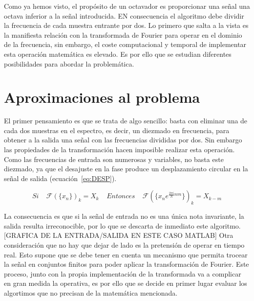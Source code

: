 Como ya hemos visto, el propósito de un octavador es proporcionar una señal una octava inferior a la señal introducida. EN consecuencia el algoritmo debe dividir la frecuencia de cada muestra entrante por dos. Lo primero que salta a la vista es la manifiesta relación con la transformada de Fourier para operar en el dominio de la frecuencia, sin embargo, el coste computacional y temporal de implementar esta operación matemática es elevado. Es por ello que se estudian diferentes posibilidades para abordar la problemática.

\section{Aproximaciones al problema}
El primer pensamiento es que se trata de algo sencillo: basta con eliminar una de cada dos muestras en el espectro, es decir, un diezmado en frecuencia, para obtener a la salida una señal con las frecuencias divididas por dos. Sin embargo las propiedades de la transformación hacen imposible realizar esta operación. Como las frecuencias de entrada son numerosas y variables, no basta este diezmado, ya que el desajuste en la fase produce un desplazamiento circular en la señal de salida (ecuación~\ref{eq:DESP}). 

\begin{equation}
\label{eq:DESP}
Si~~~~~\mathscr{F}(\{x_{n}\})_{k} = X_{k}~~~~~Entonces~~~~~\mathscr{F}(\{x_{n}e^{\frac{2\pi i}{N}nm}\})_{k}= X_{k-m} 
\end{equation}

La consecuencia es que si la señal de entrada no es una única nota invariante, la salida resulta irreconocible, por lo que se descarta  de inmediato este algoritmo. [GRAFICA DE LA ENTRADA/SALIDA EN ESTE CASO MATLAB] Otra consideración que no hay que dejar de lado es la pretensión de operar en tiempo real. Esto supone que se debe tener en cuenta un mecanismo que permita trocear la señal en conjuntos finitos para poder aplicar la transformación de Fourier. Este proceso, junto con la propia implementación de la transformada va a complicar en gran medida la operativa, es por ello que se decide en primer lugar evaluar los algortimos que no precisan de la matemática mencionada.

